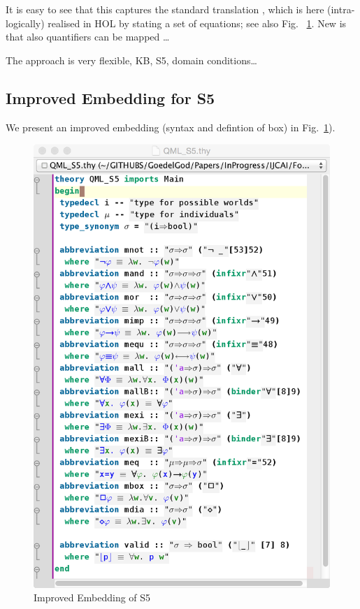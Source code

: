 \documentclass{article}
\begin{document}
It is easy
to see that this captures the standard translation \cite{Ohlbach},
which is here (intra-logically) realised in HOL by stating a set of
equations; see also Fig. ~\ref{QMLS5}. New is that also quantifiers 
can be mapped \ldots 

The approach is very flexible, KB, S5, domain conditions\ldots 


\subsection{Improved Embedding for S5}
We present an improved embedding (syntax and defintion of box) in  Fig.~\ref{QMLS5}).
\begin{figure}
\centerline{\includegraphics[width=\columnwidth]{./Images/QMLS5.png}}
\caption{Improved Embedding of S5} \label{QMLS5}
\end{figure}
\end{document}
